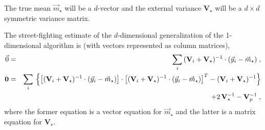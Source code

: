 \documentclass{article}
\begin{document}
The true mean $\vec{m}_\star$ will be a $d$-vector and the external
variance $\mathbf{V}_\star$ will be a $d\times d$ symmetric variance
matrix.

The street-fighting estimate of the $d$-dimensional generalization of
the 1-dimensional algorithm is (with vectors represented as column
matrices),
\begin{eqnarray}\displaystyle
\vec{0}&=&\sum_i\,(\mathbf{V}_i+\mathbf{V}_\star)^{-1}\cdot(\vec{y}_i-\vec{m}_\star)\;,\cr
\mathbf{0}&=&\sum_i\,\left\{\left[(\mathbf{V}_i+\mathbf{V}_\star)^{-1}\cdot(\vec{y}_i-\vec{m}_\star)\right]\cdot\left[(\mathbf{V}_i+\mathbf{V}_\star)^{-1}\cdot(\vec{y}_i-\vec{m}_\star)\right]^T-(\mathbf{V}_i+\mathbf{V}_\star)^{-1}\right\}\cr&&+2\,\mathbf{V}_\star^{-1}-\mathbf{V}_p^{-1}\;,
\end{eqnarray}
where the former equation is a vector equation for $\vec{m}_\star$ and
the latter is a matrix equation for $\mathbf{V}_\star$.





\end{document}

